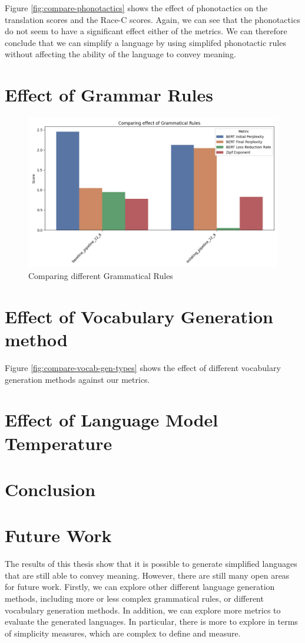 Figure \ref{fig:compare-phonotactics} shows the effect of phonotactics on the translation scores and the Race-C scores. Again, we can see that
the phonotactics do not seem to have a significant effect either of the metrics. We can therefore conclude that we can simplify a language by 
using simplifed phonotactic rules without affecting the ability of the language to convey meaning.

\section{Effect of Grammar Rules}

\begin{figure}[H]  
    \centering
    \includegraphics[width=0.7\linewidth]{figures/results/1_effect_of_grammar.png}
    \caption{Comparing different Grammatical Rules}
    \label{fig:compare-grammar}
\end{figure}



\section{Effect of Vocabulary Generation method}

Figure \ref{fig:compare-vocab-gen-types} shows the effect of different vocabulary generation methods against our metrics.

\section{Effect of Language Model Temperature}



\section{Conclusion}


\section{Future Work}
The results of this thesis show that it is possible to generate simplified languages that are still able to convey meaning. However, there are still many
open areas for future work. Firstly, we can explore other different language generation methods, including more or less complex grammatical rules,
or different vocabulary generation methods. In addition, we can explore more metrics to evaluate the generated languages. In particular, there is more to explore
in terms of simplicity measures, which are complex to define and measure.
